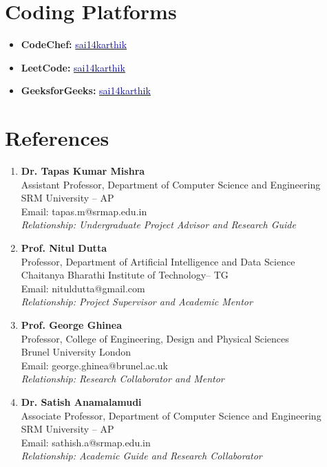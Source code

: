 \documentclass[a4paper,11pt]{article}
\begin{document}
\section{\textbf{Coding Platforms}}
\vspace{-0.2mm}
\small{
\begin{itemize}[leftmargin=*,labelsep=2mm]
  \item \textbf{CodeChef:} \href{https://www.codechef.com/users/sai14karthik}{\textcolor{darkblue}{sai14karthik}}
  \item \textbf{LeetCode:} \href{https://leetcode.com/sai14karthik}{\textcolor{darkblue}{sai14karthik}}
  \item \textbf{GeeksforGeeks:} \href{https://auth.geeksforgeeks.org/user/sai14karthik}{\textcolor{darkblue}{sai14karthik}}
\end{itemize}
}


\section{\textbf{References}}
\vspace{-0.2mm}
\small{
\begin{enumerate}[leftmargin=*,labelsep=2mm]
\item \textbf{Dr. Tapas Kumar Mishra}\\
   Assistant Professor, Department of Computer Science and Engineering\\
   SRM University – AP\\
   Email: tapas.m@srmap.edu.in\\
   \textit{Relationship: Undergraduate Project Advisor and Research Guide}

\item \textbf{Prof. Nitul Dutta}\\
   Professor, Department of Artificial Intelligence and Data Science\\
   Chaitanya Bharathi Institute of Technology– TG\\
   Email: nituldutta@gmail.com\\
   \textit{Relationship: Project Supervisor and Academic Mentor}

\item \textbf{Prof. George Ghinea}\\
   Professor, College of Engineering, Design and Physical Sciences\\
   Brunel University London\\
   Email: george.ghinea@brunel.ac.uk\\
   \textit{Relationship: Research Collaborator and Mentor}

\item \textbf{Dr. Satish Anamalamudi}\\
   Associate Professor, Department of Computer Science and Engineering\\
   SRM University – AP\\
   Email: sathish.a@srmap.edu.in\\
   \textit{Relationship: Academic Guide and Research Collaborator }
\end{enumerate}
}
\end{document}
